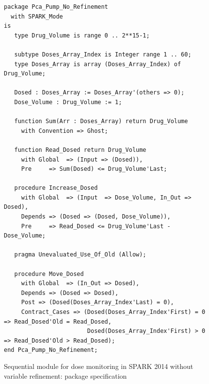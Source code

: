 \begin{figure}
\singlespacing
\begin{lstlisting}[language=ada2012, frame=single, gobble=0]
package Pca_Pump_No_Refinement
  with SPARK_Mode
is
   type Drug_Volume is range 0 .. 2**15-1;

   subtype Doses_Array_Index is Integer range 1 .. 60;
   type Doses_Array is array (Doses_Array_Index) of Drug_Volume;

   Dosed : Doses_Array := Doses_Array'(others => 0);
   Dose_Volume : Drug_Volume := 1;

   function Sum(Arr : Doses_Array) return Drug_Volume
     with Convention => Ghost;

   function Read_Dosed return Drug_Volume
     with Global  => (Input => (Dosed)),
     Pre     => Sum(Dosed) <= Drug_Volume'Last;

   procedure Increase_Dosed
     with Global  => (Input  => Dose_Volume, In_Out => Dosed),
     Depends => (Dosed => (Dosed, Dose_Volume)),
     Pre     => Read_Dosed <= Drug_Volume'Last - Dose_Volume;

   pragma Unevaluated_Use_Of_Old (Allow);

   procedure Move_Dosed
     with Global  => (In_Out => Dosed),
     Depends => (Dosed => Dosed),
     Post => (Dosed(Doses_Array_Index'Last) = 0),
     Contract_Cases => (Dosed(Doses_Array_Index'First) = 0 => Read_Dosed'Old = Read_Dosed,
                        Dosed(Doses_Array_Index'First) > 0 => Read_Dosed'Old > Read_Dosed);
end Pca_Pump_No_Refinement;
\end{lstlisting}
\doublespacing
\caption{Sequential module for dose monitoring in SPARK 2014 without variable refinement: package specification}
\label{listing:pca_pump_move_dosed_unit_spark2014_no_refinement_spec}
\end{figure}

